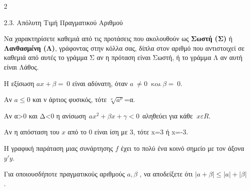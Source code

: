 \begin{ylh}{2}
    \item 2.3. Απόλυτη Τιμή Πραγματικού Αριθμού
\end{ylh}
\begin{alist}
\item Να χαρακτηρίσετε καθεμιά από τις προτάσεις που ακολουθούν ως \textbf{Σωστή (Σ)} ή \textbf{Λανθασμένη (Λ)}, γράφοντας στην κόλλα σας, δίπλα στον αριθμό που αντιστοιχεί σε καθεμιά από αυτές το γράμμα Σ αν η πρόταση είναι Σωστή, ή το γράμμα Λ αν αυτή είναι Λάθος.
\begin{rlist}
\item
  Η εξίσωση $a x + \beta = \ 0$ είναι αδύνατη, όταν $a\  \neq 0\ \text{ και}\ \beta = \ 0$.
\item
  Αν $a \leq 0$ και ν άρτιος φυσικός, τότε $\sqrt[\nu]{a^{\nu}}$=α.
\item
  Αν α\textgreater0 και Δ\textless0 η ανίσωση$\ \ a x^{2} + \beta x + \gamma < 0\ \ $αληθεύει για κάθε $\ x\varepsilon R$.
\item
  Αν η απόσταση του $x$ από το 0 είναι ίση με 3, τότε x=3 ή x=-3.
\item
  Η γραφική παράταση μιας συνάρτησης $f$ έχει το πολύ ένα κοινό σημείο με τον άξονα $y'y$.
\end{rlist}
\item Για οποιουσδήποτε πραγματικούς αριθμούς $a,\beta$ , να αποδείξετε ότι
$|a + \beta| \leq |a| + |\beta|$.
\end{alist}

